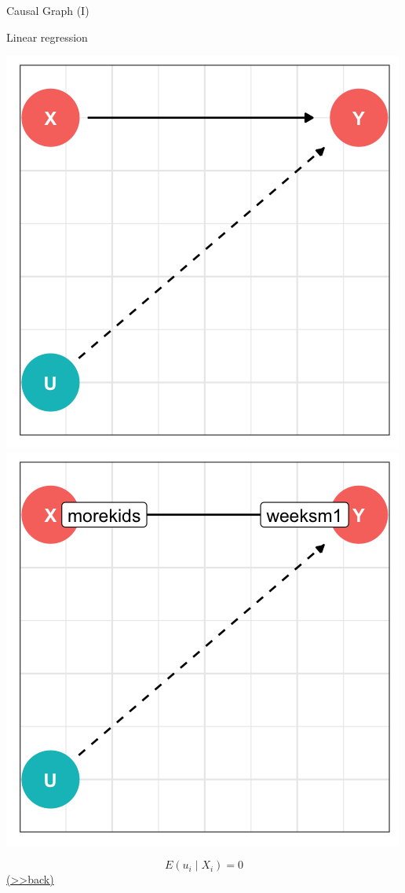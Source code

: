 \documentclass[
  10pt,
  ignorenonframetext,
]{beamer}
\begin{document}
\begin{frame}{Causal Graph (I)}
\protect\hypertarget{LGCG}{}
\begin{block}{Linear regression}
\protect\hypertarget{linear-regression-1}{}
\begin{center}\includegraphics[width=0.4\linewidth,height=0.54\textheight]{pictures/LGsetting1} \includegraphics[width=0.4\linewidth,height=0.54\textheight]{pictures/LGsetting2} \end{center}

\[
E(u_i \mid X_i) = 0
\] \footnotesize\protect\hyperlink{LGQ}{(\textgreater\textgreater back)}
\normalsize
\end{block}
\end{frame}
\end{document}
